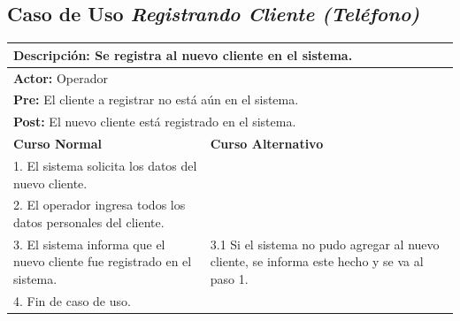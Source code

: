 \documentclass[a4paper]{article}
\begin{document}
\subsection{Caso de Uso \textit{Registrando Cliente (Tel\'efono)}}
\begin{center}
\begin{tabular}{|p{10cm} | p{6cm}|}
\hline
\multicolumn{2}{|p{16cm}|}{\textbf{Descripci\'on:} Se registra al nuevo cliente en el sistema.} \\
\hline
\multicolumn{2}{|l|}{\textbf{Actor:} Operador} \\
\hline
\multicolumn{2}{|l|}{\textbf{Pre:} El cliente a registrar no est\'a a\'un en el sistema.} \\
\hline
\multicolumn{2}{|p{14cm}|}{\textbf{Post:} El nuevo cliente est\'a registrado en el sistema.}\\
\hline
\textbf{Curso Normal}  & \textbf{Curso Alternativo} \\ \hline
1. El sistema solicita los datos del nuevo cliente. & \\ \hline
2. El operador ingresa todos los datos personales del cliente. & \\ \hline
3. El sistema informa que el nuevo cliente fue registrado en el sistema. & 3.1 Si el sistema no pudo agregar al nuevo cliente, se informa este hecho y se va al paso 1. \\ \hline
4. Fin de caso de uso. & \\ \hline
\end{tabular}
\end{center}
\end{document}

